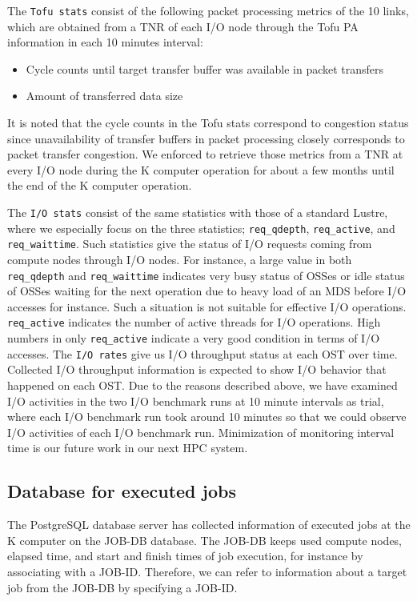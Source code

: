 \documentclass{jhps}
\begin{document}
The {\tt Tofu stats} consist of the following packet processing metrics of the 10 links,
which are obtained from a TNR of each I/O node through the Tofu PA information
in each 10 minutes interval:
%
\begin{itemize}
\item Cycle counts until target transfer buffer was available in packet transfers
\item Amount of transferred data size
\end{itemize}
%
It is noted that the cycle counts in the Tofu stats correspond to congestion status
since unavailability of transfer buffers in packet processing closely corresponds to
packet transfer congestion.
We enforced to retrieve those metrics from a TNR at every I/O node
during the K computer operation for about a few months
until the end of the K computer operation.

The {\tt I/O stats} consist of the same statistics with those of a standard Lustre,
where we especially focus on the three statistics; {\tt req\_qdepth}, {\tt req\_active},
and {\tt req\_waittime}.
Such statistics give the status of I/O requests coming from compute nodes through I/O nodes.
For instance, a large value in both {\tt req\_qdepth} and {\tt req\_waittime} indicates
very busy status of OSSes or idle status of OSSes waiting for the next operation
due to heavy load of an MDS before I/O accesses for instance.
Such a situation is not suitable for effective I/O operations.
{\tt req\_active} indicates the number of active threads for I/O operations.
High numbers in only {\tt req\_active} indicate a very good condition in terms of I/O accesses.
The {\tt I/O rates} give us I/O throughput status at each OST over time.
Collected I/O throughput information is expected to show I/O behavior that happened
on each OST.
Due to the reasons described above, we have examined I/O activities
in the two I/O benchmark runs at 10 minute intervals as trial,
where each I/O benchmark run took around 10 minutes so that we could observe
I/O activities of each I/O benchmark run.
Minimization of monitoring interval time is our future work in our next HPC system.

\subsection{Database for executed jobs}

The PostgreSQL database server has collected information of executed jobs at the K computer
on the JOB-DB database.
The JOB-DB keeps used compute nodes, elapsed time, and start and finish times of job execution,
for instance by associating with a JOB-ID.
Therefore, we can refer to information about a target job from the JOB-DB by specifying a JOB-ID.
\end{document}
